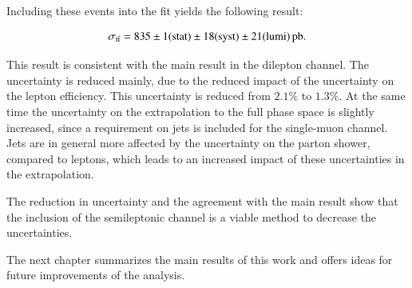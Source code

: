 Including these events into the fit yields the following result:

\begin{equation}
\sigma_{\mathrm{t}\bar{\mathrm{t}}} = 835 \pm  1 ({\rm stat}) \pm  18({\rm syst}) \pm 21 ({\rm lumi}) \mbox{\ensuremath{\,\text{pb}}}.
\end{equation}

This result is consistent with the main result in the dilepton channel.
The uncertainty is reduced mainly, due to the reduced impact of the uncertainty on the lepton efficiency. This
uncertainty is reduced from $2.1\%$ to $1.3\%$. At the same time the uncertainty on the extrapolation to the full phase space is slightly increased, since a requirement
on jets is included for the single-muon channel. Jets are in general more affected by the uncertainty on the parton shower, compared to leptons, which leads to an increased
impact of these uncertainties in the extrapolation.

The reduction in uncertainty and the agreement with the main result show that the inclusion of the semileptonic channel is a viable method to decrease the uncertainties.

The next chapter summarizes the main results of this work and offers ideas for future improvements of the analysis.

